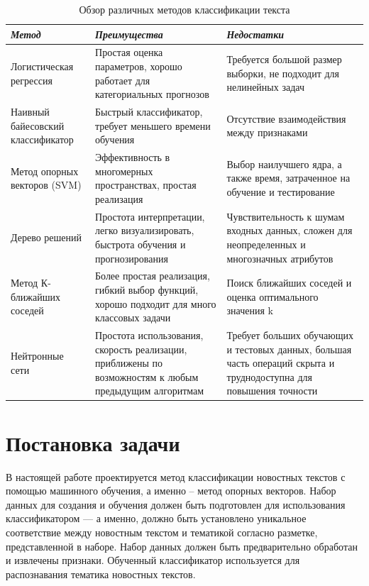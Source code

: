 \begin{table}[H]
	\centering
	\caption{Обзор различных методов классификации текста}\label{compare}
	\begin{tabular}{|m{7em}|m{12em}|m{12em}|}
		\hline
        \textit{Метод} & \textit{Преимущества} & \textit{Недостатки}\\ \hline
		Логистическая регрессия & Простая оценка параметров, хорошо работает для категориальных прогнозов & Требуется большой размер выборки, не подходит для нелинейных задач \\ \hline
  
        Наивный байесовский классификатор & Быстрый классификатор, требует меньшего времени обучения & Отсутствие взаимодействия между признаками \\ \hline
        
        Метод опорных векторов (SVM) & Эффективность в многомерных пространствах, простая реализация & Выбор наилучшего ядра, а также время, затраченное на обучение и тестирование \\ \hline
        
        Дерево решений & Простота интерпретации, легко визуализировать, быстрота обучения и прогнозирования & Чувствительность к шумам входных данных, сложен для неопределенных и многозначных атрибутов \\ \hline
        
        Метод К-ближайших соседей & Более простая реализация, гибкий выбор функций, хорошо подходит для много классовых задачи & Поиск ближайших соседей и оценка оптимального значения k \\ \hline
        Нейтронные сети & Простота использования, скорость реализации, приближены по возможностям к любым предыдущим алгоритмам & Требует больших обучающих и тестовых данных, большая часть операций скрыта и труднодоступна для повышения точности \\ \hline
	\end{tabular}
\end{table}

\section{Постановка задачи}
В настоящей работе проектируется метод классификации новостных текстов с помощью машинного обучения, а именно – метод опорных векторов. Набор данных для создания и обучения должен быть подготовлен для использования классификатором — а именно, должно быть установлено уникальное соответствие между новостным текстом и тематикой согласно разметке, представленной в наборе. Набор данных должен быть предварительно обработан и извлечены признаки. Обученный классификатор используется для распознавания тематика новостных текстов.

